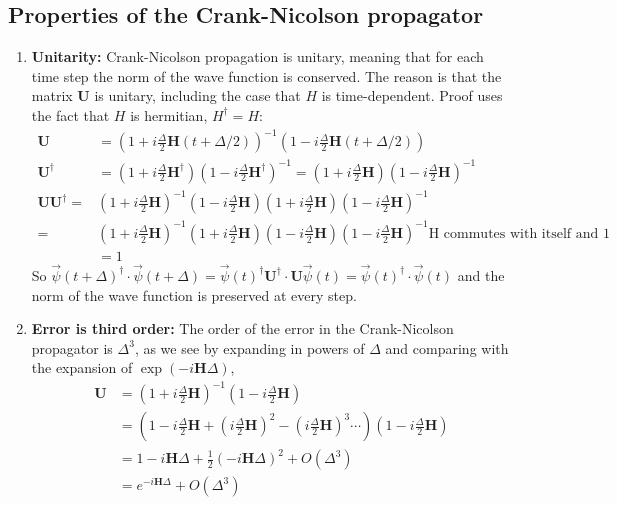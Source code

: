 \documentclass[aps,amssymb,superscriptaddress,floatfix]{revtex4}
\begin{document}
\subsection{Properties of the Crank-Nicolson propagator}



\begin{enumerate}
\item{\textbf{Unitarity:}   Crank-Nicolson propagation is unitary, meaning that for each time step the norm of the wave function is conserved.   The reason is that the matrix $\mathbf{U}$ is unitary, including the case that $H$ is time-dependent.   Proof uses the fact that  $H$ is hermitian, $H^\dagger = H$:
\begin{equation}
\begin{split}
\mathbf{U}&=\left(1+i\frac{\Delta}{2}\mathbf{H}(t+\Delta/2)\right)^{-1} \left(1- i\frac{\Delta}{2}\mathbf{H}(t+\Delta/2)\right) \\
\mathbf{U}^\dagger& =  \left(1+ i\frac{\Delta}{2}\mathbf{H}^\dagger \right) \left(1-i\frac{\Delta}{2}\mathbf{H}^\dagger\right)^{-1} 
 =  \left(1+ i\frac{\Delta}{2}\mathbf{H} \right) \left(1-i\frac{\Delta}{2}\mathbf{H} \right)^{-1} \\
\mathbf{U} \mathbf{U}^\dagger =& \left(1+i\frac{\Delta}{2}\mathbf{H}\right)^{-1} \left(1- i\frac{\Delta}{2}\mathbf{H}\right)
                             \left(1+ i\frac{\Delta}{2}\mathbf{H}\right) \left(1-i\frac{\Delta}{2}\mathbf{H}\right)^{-1}  \\
                       =&       \left(1+i\frac{\Delta}{2}\mathbf{H}\right)^{-1} \left(1+ i\frac{\Delta}{2}\mathbf{H}\right)
                             \left(1- i\frac{\Delta}{2}\mathbf{H}\right) \left(1-i\frac{\Delta}{2}\mathbf{H}\right)^{-1} 
                             \textrm{H commutes with itself and 1} \\
                           &  = 1
\end{split}
\end{equation}
So $\vec{\psi} (t+\Delta)^\dagger \cdot \vec{\psi}(t+\Delta)= \vec{\psi}(t)^\dagger \mathbf{U}^\dagger  \cdot \mathbf{U} \vec{\psi}(t) = \vec{\psi}(t)^\dagger \cdot \vec{\psi}(t) $ and the norm of the wave function is preserved at every step.
}

\item{\textbf{Error is third order:} The order of the error in the Crank-Nicolson propagator is $\Delta^3$, as we see by expanding in powers of $\Delta$ and comparing with the expansion of $\exp(-i\mathbf{H}\Delta)$, 
\begin{equation}
\begin{split}
\mathbf{U}&=\left(1+i\frac{\Delta}{2}\mathbf{H}\right)^{-1} \left(1- i\frac{\Delta}{2}\mathbf{H}\right) \\
&= \left(1 - i\frac{\Delta}{2}\mathbf{H} +(i\frac{\Delta}{2}\mathbf{H})^2 -(i\frac{\Delta}{2}\mathbf{H})^3\cdots\right) \left(1- i\frac{\Delta}{2}\mathbf{H}\right) \\
&= 1 - i\mathbf{H}\Delta +\frac{1}{2} \left(- i\mathbf{H}\Delta \right)^2 + O(\Delta^3) \\
&= e^{-i\mathbf{H} \Delta} + O(\Delta^3)
\end{split}
\end{equation}
}


\end{enumerate}
\end{document}
